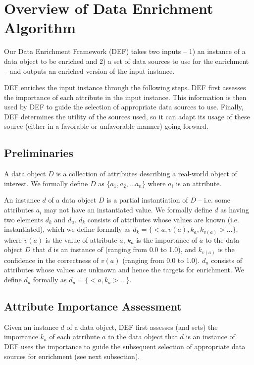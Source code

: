 \section{Overview of Data Enrichment Algorithm}

Our Data Enrichment Framework (DEF) takes two inputs -- 1) an instance of a data object to be enriched 
and 2) a set of data sources to use for the enrichment -- and outputs an enriched version of the input 
instance. 

DEF enriches the input instance through the following steps. DEF first assesses the importance of each 
attribute in the input instance. This information is then used by DEF to guide the selection of appropriate 
data sources to use. Finally, DEF determines the utility of the sources used, so it can adapt its usage 
of these source (either in a favorable or unfavorable manner) going forward.


\subsection{Preliminaries}

A data object $D$ is a collection of attributes describing a real-world object of interest. We formally
define $D$ as $\lbrace a_1, a_2, ... a_n \rbrace$ where $a_i$ is an attribute.

An instance $d$ of a data object $D$ is a partial instantiation of $D$ -- i.e. some attributes $a_i$ may 
not have an instantiated value. We formally define $d$ as having two elements $d_k$ and $d_u$. $d_k$ 
consists of attributes whose values are known (i.e. instantiated), which we define formally as $d_k = 
\lbrace <a,v(a),k_a,k_{v(a)}> ... \rbrace$, where $v(a)$ is the value of attribute $a$, $k_a$ is the 
importance of $a$ to the data object $D$ that $d$ is an instance of (ranging from 0.0 to 1.0), and 
$k_{v(a)}$ is the confidence in the correctness of $v(a)$ (ranging from 0.0 to 1.0). $d_u$ consists of 
attributes whose values are unknown and hence the targets for enrichment. We define $d_u$ formally as 
$d_u= \lbrace <a,k_a> ... \rbrace$.

\subsection{Attribute Importance Assessment} 

Given an instance $d$ of a data object, DEF first assesses (and sets) the importance $k_a$ of each 
attribute $a$ to the data object that $d$ is an instance of. DEF uses the importance to guide the 
subsequent selection of appropriate data sources for enrichment (see next subsection).


